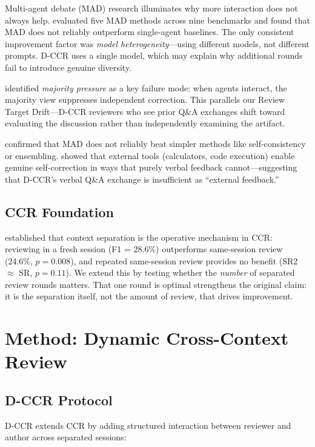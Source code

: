 \documentclass[11pt]{article}
\begin{document}
Multi-agent debate (MAD) research illuminates why more interaction does not always help.
\citet{zhang2025mad} evaluated five MAD methods across nine benchmarks and found that MAD does not reliably outperform single-agent baselines.
The only consistent improvement factor was \emph{model heterogeneity}---using different models, not different prompts.
D-CCR uses a single model, which may explain why additional rounds fail to introduce genuine diversity.

\citet{wu2025debate} identified \emph{majority pressure} as a key failure mode: when agents interact, the majority view suppresses independent correction.
This parallels our Review Target Drift---D-CCR reviewers who see prior Q\&A exchanges shift toward evaluating the discussion rather than independently examining the artifact.

\citet{smit2024mad} confirmed that MAD does not reliably beat simpler methods like self-consistency or ensembling.
\citet{gou2024critic} showed that external tools (calculators, code execution) enable genuine self-correction in ways that purely verbal feedback cannot---suggesting that D-CCR's verbal Q\&A exchange is insufficient as ``external feedback.''

\subsection{CCR Foundation}

\citet{song2026ccr} established that context separation is the operative mechanism in CCR: reviewing in a fresh session (F1 = 28.6\%) outperforms same-session review (24.6\%, $p = 0.008$), and repeated same-session review provides no benefit (SR2 $\approx$ SR, $p = 0.11$).
We extend this by testing whether the \emph{number} of separated review rounds matters.
That one round is optimal strengthens the original claim: it is the separation itself, not the amount of review, that drives improvement.

\section{Method: Dynamic Cross-Context Review}

\subsection{D-CCR Protocol}

D-CCR extends CCR by adding structured interaction between reviewer and author across separated sessions:
\end{document}
